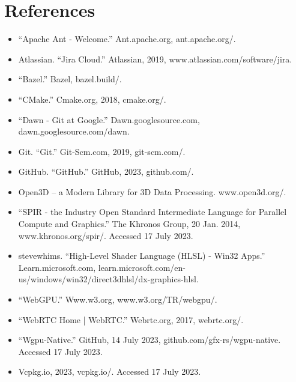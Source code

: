 
\chapter{References} %

\label{Chapter7} %


\begin{itemize}
    \item “Apache Ant - Welcome.” Ant.apache.org, ant.apache.org/.

    \item Atlassian. “Jira Cloud.” Atlassian, 2019, www.atlassian.com/software/jira.

    \item “Bazel.” Bazel, bazel.build/.

    \item “CMake.” Cmake.org, 2018, cmake.org/.

    \item “Dawn - Git at Google.” Dawn.googlesource.com, dawn.googlesource.com/dawn.

    \item Git. “Git.” Git-Scm.com, 2019, git-scm.com/.

    \item GitHub. “GitHub.” GitHub, 2023, github.com/.

    \item Open3D – a Modern Library for 3D Data Processing. www.open3d.org/.

    \item “SPIR - the Industry Open Standard Intermediate Language for Parallel Compute and Graphics.” The Khronos Group, 20 Jan. 2014, www.khronos.org/spir/. Accessed 17 July 2023.

    \item stevewhims. “High-Level Shader Language (HLSL) - Win32 Apps.” Learn.microsoft.com, learn.microsoft.com/en-us/windows/win32/direct3dhlsl/dx-graphics-hlsl.

    \item “WebGPU.” Www.w3.org, www.w3.org/TR/webgpu/.

    \item “WebRTC Home | WebRTC.” Webrtc.org, 2017, webrtc.org/.

    \item “Wgpu-Native.” GitHub, 14 July 2023, github.com/gfx-rs/wgpu-native. Accessed 17 July 2023.

    \item Vcpkg.io, 2023, vcpkg.io/. Accessed 17 July 2023.
\end{itemize}
